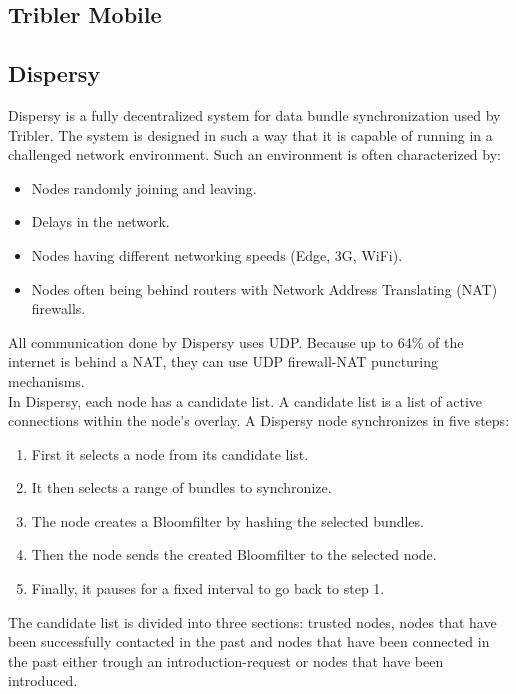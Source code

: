\documentclass[11pt]{article}
\begin{document}
\subsection{Tribler Mobile}

\subsection{Dispersy}
Dispersy \cite{zeilemaker2013dispersy} is a fully decentralized system for data bundle synchronization used by Tribler. The system is designed in such a way that it is capable of running in a challenged network environment. Such an environment is often characterized by:
\begin{itemize}
\item Nodes randomly joining and leaving.
\item Delays in the network.
\item Nodes having different networking speeds (Edge, 3G, WiFi).
\item Nodes often being behind routers with Network Address Translating (NAT) firewalls.
\end{itemize}

All communication done by Dispersy uses UDP. Because up to 64\% of the internet is behind a NAT, they can use UDP firewall-NAT puncturing mechanisms.\\

In Dispersy, each node has a candidate list. A candidate list is a list of active connections within the node's overlay. A Dispersy node synchronizes in five steps:

\begin{enumerate}
\item First it selects a node from its candidate list.
\item It then selects a range of bundles to synchronize.
\item The node creates a Bloomfilter by hashing the selected bundles.
\item Then the node sends the created Bloomfilter to the selected node.
\item Finally, it pauses for a fixed interval to go back to step 1.
\end{enumerate}

The candidate list is divided into three sections: trusted nodes, nodes that have been successfully contacted in the past and nodes that have been connected in the past either trough an introduction-request or nodes that have been introduced.\\
\end{document}
